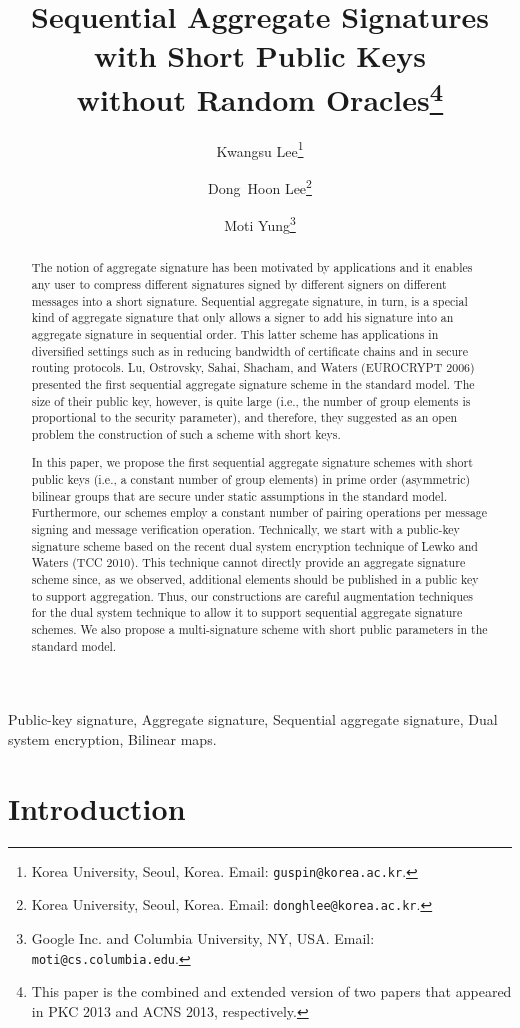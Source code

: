 \documentclass[11pt,letterpaper]{article}
\title{Sequential Aggregate Signatures with Short Public Keys\\ without
    Random Oracles\footnote{This paper is the combined and extended version
    of two papers \cite{LeeLY13s,LeeLY13m} that appeared in PKC 2013 and
    ACNS 2013, respectively.}}
\author{
    Kwangsu Lee\footnote{Korea University, Seoul, Korea.
        Email: \texttt{guspin@korea.ac.kr}.}
        \and
    Dong~Hoon Lee\footnote{Korea University, Seoul, Korea.
        Email: \texttt{donghlee@korea.ac.kr}.}
        \and
    Moti Yung\footnote{Google Inc. and Columbia University, NY, USA.
        Email: \texttt{moti@cs.columbia.edu}.}
}
\date{}
\newcommand{\vs}{\vspace{1.5mm}}
\begin{document}
\maketitle

\begin{abstract}
The notion of aggregate signature has been motivated by applications and it
enables any user to compress different signatures signed by different
signers on different messages into a short signature. Sequential aggregate
signature, in turn, is a special kind of aggregate signature that only
allows a signer to add his signature into an aggregate signature in
sequential order. This latter scheme has applications in diversified
settings such as in reducing bandwidth of certificate chains and in secure
routing protocols. Lu, Ostrovsky, Sahai, Shacham, and Waters (EUROCRYPT
2006) presented the first sequential aggregate signature scheme in the
standard model. The size of their public key, however, is quite large
(i.e., the number of group elements is proportional to the security
parameter), and therefore, they suggested as an open problem the
construction of such a scheme with short keys.

In this paper, we propose the first sequential aggregate signature schemes
with short public keys (i.e., a constant number of group elements) in prime
order (asymmetric) bilinear groups that are secure under static assumptions
in the standard model. Furthermore, our schemes employ a constant number of
pairing operations per message signing and message verification operation.
Technically, we start with a public-key signature scheme based on the
recent dual system encryption technique of Lewko and Waters (TCC 2010).
This technique cannot directly provide an aggregate signature scheme since,
as we observed, additional elements should be published in a public key to
support aggregation. Thus, our constructions are careful augmentation
techniques for the dual system technique to allow it to support sequential
aggregate signature schemes. We also propose a multi-signature scheme with
short public parameters in the standard model.
\end{abstract}

\vs {} Public-key signature, Aggregate signature,
Sequential aggregate signature, Dual system encryption, Bilinear maps.

\newpage
\tableofcontents
\newpage

\section{Introduction}
\end{document}
